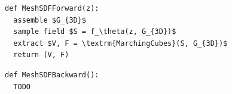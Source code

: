 \documentclass[book.tex]{subfiles}
\begin{document}
\begin{lstlisting}
def MeshSDFForward(z):
  assemble $G_{3D}$
  sample field $S = f_\theta(z, G_{3D})$
  extract $V, F = \textrm{MarchingCubes}(S, G_{3D})$
  return (V, F)
\end{lstlisting}

\begin{lstlisting}
def MeshSDFBackward():
  TODO
\end{lstlisting}

\end{document}
